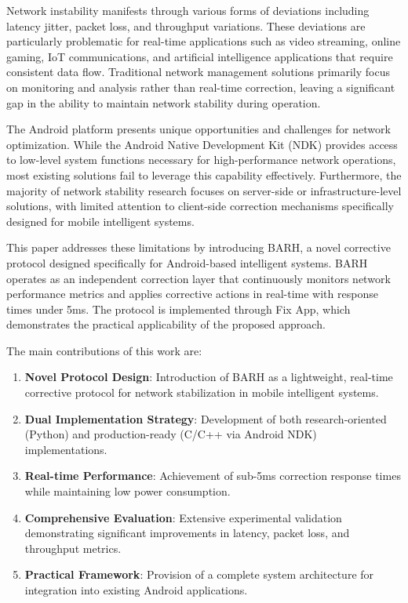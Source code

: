 \documentclass[conference]{IEEEtran}
\begin{document}
Network instability manifests through various forms of deviations including latency jitter, packet loss, and throughput variations. These deviations are particularly problematic for real-time applications such as video streaming, online gaming, IoT communications, and artificial intelligence applications that require consistent data flow. Traditional network management solutions primarily focus on monitoring and analysis rather than real-time correction, leaving a significant gap in the ability to maintain network stability during operation.

The Android platform presents unique opportunities and challenges for network optimization. While the Android Native Development Kit (NDK) provides access to low-level system functions necessary for high-performance network operations, most existing solutions fail to leverage this capability effectively. Furthermore, the majority of network stability research focuses on server-side or infrastructure-level solutions, with limited attention to client-side correction mechanisms specifically designed for mobile intelligent systems.

This paper addresses these limitations by introducing BARH, a novel corrective protocol designed specifically for Android-based intelligent systems. BARH operates as an independent correction layer that continuously monitors network performance metrics and applies corrective actions in real-time with response times under 5ms. The protocol is implemented through Fix App, which demonstrates the practical applicability of the proposed approach.

The main contributions of this work are:
\begin{enumerate}
\item \textbf{Novel Protocol Design}: Introduction of BARH as a lightweight, real-time corrective protocol for network stabilization in mobile intelligent systems.
\item \textbf{Dual Implementation Strategy}: Development of both research-oriented (Python) and production-ready (C/C++ via Android NDK) implementations.
\item \textbf{Real-time Performance}: Achievement of sub-5ms correction response times while maintaining low power consumption.
\item \textbf{Comprehensive Evaluation}: Extensive experimental validation demonstrating significant improvements in latency, packet loss, and throughput metrics.
\item \textbf{Practical Framework}: Provision of a complete system architecture for integration into existing Android applications.
\end{enumerate}
\end{document}
